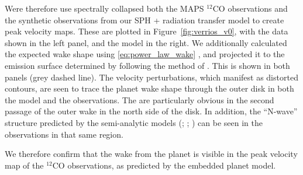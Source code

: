 Were therefore use spectrally collapsed both the MAPS $^{12}$CO observations \citep{oberg2021} and the synthetic observations from our SPH + radiation transfer model to create peak velocity maps.
These are plotted in Figure~\ref{fig:verrios_v0}, with the data shown in the left panel, and the model in the right.
We additionally calculated the expected wake shape using \ref{eq:power_law_wake} \citep{ogilvie2002,rafikov2002a}, and projected it to the emission surface determined by \citet{law2021a} following the method of \citet{calcino2022}.
This is shown in both panels (grey dashed line).
The velocity perturbations, which manifest as distorted contours, are seen to trace the planet wake shape through the outer disk in both the model and the observations.
The are particularly obvious in the second passage of the outer wake in the north side of the disk.
In addition, the ``N-wave'' structure predicted by the semi-analytic models (\citealt{goodman2001}; \citealt{rafikov2002a}; ) can be seen in the observations in that same region.

We therefore confirm that the wake from the planet is visible in the peak velocity map of the $^{12}$CO observations, as predicted by the embedded planet model.




